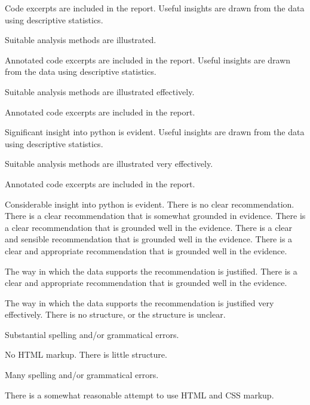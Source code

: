 \documentclass{../../fal_assignment}
\begin{document}
\begin{markingrubric}
        \par 			Code excerpts are included in the report.
        \grade 		Useful insights are drawn from the data using descriptive statistics.
        \par 			Suitable analysis methods are illustrated.
        \par 			Annotated code excerpts are included in the report.
        \grade 		Useful insights are drawn from the data using descriptive statistics.
        \par 			Suitable analysis methods are illustrated effectively.
        \par 			Annotated code excerpts are included in the report.
        \par 			Significant insight into python is evident.
        \grade 		Useful insights are drawn from the data using descriptive statistics.
        \par 			Suitable analysis methods are illustrated very effectively.
        \par 			Annotated code excerpts are included in the report.
        \par 			Considerable insight into python is evident.
%
        \grade\fail 	There is no clear recommendation.
        \grade		There is a clear recommendation that is somewhat grounded in evidence.
        \grade		There is a clear recommendation that is grounded well in the evidence.
        \grade		There is a clear and sensible recommendation that is grounded well in the evidence.
        \grade		There is a clear and appropriate recommendation that is grounded well in the evidence.
        \par 			The way in which the data supports the recommendation is justified.
        \grade		There is a clear and appropriate recommendation that is grounded well in the evidence.
        \par 			The way in which the data supports the recommendation is justified very effectively.	
%
        \grade\fail 	There is no structure, or the structure is unclear.
        \par			Substantial spelling and/or grammatical errors.
        \par			No HTML markup.
        \grade 		There is little structure.
        \par 			Many spelling and/or grammatical errors.
        \par			There is a somewhat reasonable attempt to use HTML and CSS markup.

\end{markingrubric}
\end{document}
